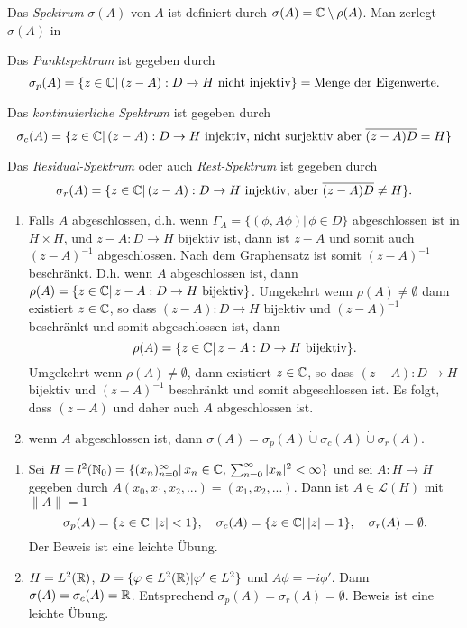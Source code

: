 \documentclass{mycourse}
\begin{document}
Das \emph{Spektrum} $\sigma(A)$ von $A$ ist definiert durch $\sigma(A)=\mathbb{C}\setminus \rho(A)$. Man zerlegt $\sigma(A)$ in
\begin{seg}[Punktsprektum]
Das \emph{Punktspektrum} ist gegeben durch
\[
\sigma_p(A)=\{z\in \mathbb{C} |\, (z-A): D\to H \text{ nicht injektiv}\}= \text{Menge der Eigenwerte.}
\]
\end{seg}
\begin{seg}
Das \emph{kontinuierliche Spektrum} ist gegeben durch
\[
\sigma_c(A)=\{z\in \mathbb{C}|\, (z-A): D\to H \text{ injektiv, nicht surjektiv aber } \overline{(z-A)D}= H\}
\]
\end{seg}
\begin{seg}
Das \emph{Residual-Spektrum} oder auch \emph{Rest-Spektrum} ist gegeben durch
\[
\sigma_r(A)=\{z\in \mathbb{C}|\, (z-A):D \to H \text{ injektiv, aber } \overline{(z-A)D}\neq H\}.
\]
\end{seg}
\begin{nt*}
\begin{enumerate}[1)]
\item Falls $A$ abgeschlossen, d.h. wenn $\Gamma_A= \{(\phi, A\phi)|\, \phi \in D\}$ abgeschlossen ist in $H\times H$, und $z-A: D \to H$ bijektiv ist, dann ist $z-A$ und somit auch $(z-A)^{-1}$ abgeschlossen. Nach dem Graphensatz ist somit $(z-A)^{-1}$ beschränkt. D.h. wenn $A$ abgeschlossen ist, dann $\rho(A)=\{z\in \mathbb{C}|\, z-A: D \to H \text{ bijektiv}\}$. Umgekehrt wenn $\rho(A) \neq \emptyset$ dann existiert $z\in \mathbb{C}$, so dass $(z-A):D\to H$ bijektiv und $(z-A)^{-1}$ beschränkt und somit abgeschlossen ist, dann
\[
\rho(A)=\{z\in \mathbb{C}|\, z-A: D\to H \text{ bijektiv}\}.
\]
Umgekehrt wenn $\rho(A)\neq \emptyset$, dann existiert $z\in \mathbb{C}$, so dass $(z-A):D\to H$ bijektiv und $(z-A)^{-1}$ beschränkt und somit abgeschlossen ist. Es folgt, dass $(z-A)$ und daher auch $A$ abgeschlossen ist.
\item wenn $A$ abgeschlossen ist, dann $\sigma(A)=\sigma_p(A) \dot\cup \sigma_c(A) \dot\cup \sigma_r(A)$.
\end{enumerate}
\end{nt*}
\begin{ex*}
\begin{enumerate}[1)]
\item Sei $H= l^2(\mathbb{N}_0)=\{(x_n)_{n=0}^\infty |\, x_n \in \mathbb{C},\, \sum_{n=0}^\infty|x_n|^2<\infty\}$ und sei $A: H\to H$ gegeben durch $A(x_0, x_1, x_2,...)=(x_1, x_2,...)$. Dann ist $A\in \mathcal L(H)$ mit $\|A\|=1$
\[
\sigma_p(A)=\{z\in \mathbb{C}|\, |z|<1\}, \quad \sigma_c(A)=\{z\in \mathbb{C}|\, |z|=1\}, \quad \sigma_r(A)=\emptyset.
\]
Der Beweis ist eine leichte Übung.
\item $H=L^2(\mathbb{R})$, $D=\{\varphi\in L^2(\mathbb{R})| \varphi'\in L^2\}$ und $A\phi=-i \phi'$. Dann $\sigma(A)=\sigma_c(A)=\mathbb{R}$. Entsprechend $\sigma_p(A)=\sigma_r(A)= \emptyset$. Beweis ist eine leichte Übung.
\end{enumerate}
\end{ex*}
\end{document}
